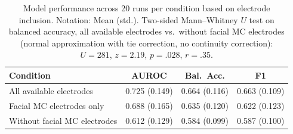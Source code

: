 \begin{table}[ht]
\centering
\caption{Model performance across 20 runs per condition based on electrode inclusion. Notation: Mean (std.). Two-sided Mann--Whitney $U$ test on balanced accuracy, all available electrodes vs.\ without facial MC electrodes (normal approximation with tie correction, no continuity correction): $U = 281$, $z = 2.19$, $p = .028$, $r = .35$.}
\label{tab:facial_mc_ablation}
\begin{tabular}{lccc}
\toprule
Condition & AUROC & Bal.\ Acc. & F1 \\
\midrule
All available electrodes & 0.725 (0.149) & 0.664 (0.116) & 0.663 (0.109) \\
Facial MC electrodes only & 0.688 (0.165) & 0.635 (0.120) & 0.622 (0.123) \\
Without facial MC electrodes & 0.612 (0.129) & 0.584 (0.099) & 0.587 (0.100) \\
\bottomrule
\end{tabular}
\end{table}
